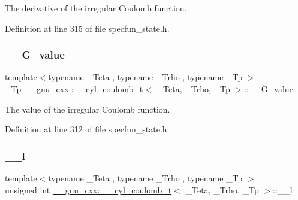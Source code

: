 The derivative of the irregular Coulomb function. 



Definition at line 315 of file specfun\+\_\+state.\+h.

\mbox{\label{struct____gnu__cxx_1_1____cyl__coulomb__t_a918861ff5873097675aa5fc9d5d3a5cd}} 
\subsubsection{\texorpdfstring{\+\_\+\+\_\+\+G\+\_\+value}{\_\_G\_value}}
{\footnotesize\ttfamily template$<$typename \+\_\+\+Teta , typename \+\_\+\+Trho , typename \+\_\+\+Tp $>$ \\
\+\_\+\+Tp \hyperlink{struct____gnu__cxx_1_1____cyl__coulomb__t}{\+\_\+\+\_\+gnu\+\_\+cxx\+::\+\_\+\+\_\+cyl\+\_\+coulomb\+\_\+t}$<$ \+\_\+\+Teta, \+\_\+\+Trho, \+\_\+\+Tp $>$\+::\+\_\+\+\_\+\+G\+\_\+value}



The value of the irregular Coulomb function. 



Definition at line 312 of file specfun\+\_\+state.\+h.

\mbox{\label{struct____gnu__cxx_1_1____cyl__coulomb__t_a402fdb5865c435194f923e50e551799e}} 
\subsubsection{\texorpdfstring{\+\_\+\+\_\+l}{\_\_l}}
{\footnotesize\ttfamily template$<$typename \+\_\+\+Teta , typename \+\_\+\+Trho , typename \+\_\+\+Tp $>$ \\
unsigned int \hyperlink{struct____gnu__cxx_1_1____cyl__coulomb__t}{\+\_\+\+\_\+gnu\+\_\+cxx\+::\+\_\+\+\_\+cyl\+\_\+coulomb\+\_\+t}$<$ \+\_\+\+Teta, \+\_\+\+Trho, \+\_\+\+Tp $>$\+::\+\_\+\+\_\+l}



